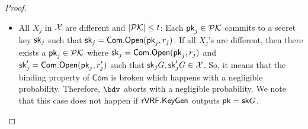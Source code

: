 \begin{proof}
	\begin{itemize}
		
		\item All $ X_j $ in $ {\mathcal{X}} $ are different  and $ |{\mathcal{PK}}| \leq t $: Each $ \mathsf{pk}_j \in {\ensuremath{\mathcal{PK}}} $ commits to a secret key $ \mathsf{sk}_j $ such that $ \mathsf{sk}_j = \mathsf{Com}.\mathsf{Open}(\mathsf{pk}_j, r_j) $. If all $ X_j $'s are different, then there exists a $ \mathsf{pk}_j \in {\ensuremath{\mathcal{PK}}} $ where $ \mathsf{sk}_j = \mathsf{Com}.\mathsf{Open}(\mathsf{pk}_j, r_j) $ and $ \mathsf{sk}'_j = \mathsf{Com}.\mathsf{Open}(\mathsf{pk}_j, r'_j) $ such that $ \mathsf{sk}_j G, \mathsf{sk}_j'G \in {\ensuremath{\mathcal{X}}} $. So, it  means that the binding property of $ \mathsf{Com} $ is broken which happens with a negligible probability. Therefore, $ \bdv  $ aborts with a negligible probability. We note that this case does not happen if $ {\mathsf{rVRF}}.{\mathsf{KeyGen}} $  outputs $ \mathsf{pk} = \mathsf{sk} G $. 
		

\end{itemize}
\end{proof}
